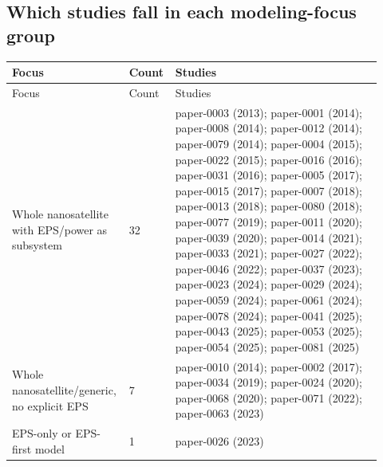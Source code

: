 \documentclass[11pt]{article}
\begin{document}
\subsection{Which studies fall in each modeling-focus group}
\begin{longtable}{p{0.27\linewidth}p{0.10\linewidth}p{0.55\linewidth}}
\toprule Focus & Count & Studies \\
\midrule\endfirsthead
\toprule Focus & Count & Studies \\ \midrule\endhead
Whole nanosatellite with EPS/power as subsystem & 32 & paper-0003 (2013); paper-0001 (2014); paper-0008 (2014); paper-0012 (2014); paper-0079 (2014); paper-0004 (2015); paper-0022 (2015); paper-0016 (2016); paper-0031 (2016); paper-0005 (2017); paper-0015 (2017); paper-0007 (2018); paper-0013 (2018); paper-0080 (2018); paper-0077 (2019); paper-0011 (2020); paper-0039 (2020); paper-0014 (2021); paper-0033 (2021); paper-0027 (2022); paper-0046 (2022); paper-0037 (2023); paper-0023 (2024); paper-0029 (2024); paper-0059 (2024); paper-0061 (2024); paper-0078 (2024); paper-0041 (2025); paper-0043 (2025); paper-0053 (2025); paper-0054 (2025); paper-0081 (2025) \\
Whole nanosatellite/generic, no explicit EPS & 7 & paper-0010 (2014); paper-0002 (2017); paper-0034 (2019); paper-0024 (2020); paper-0068 (2020); paper-0071 (2022); paper-0063 (2023) \\
EPS-only or EPS-first model & 1 & paper-0026 (2023) \\
\bottomrule\end{longtable}
\end{document}
